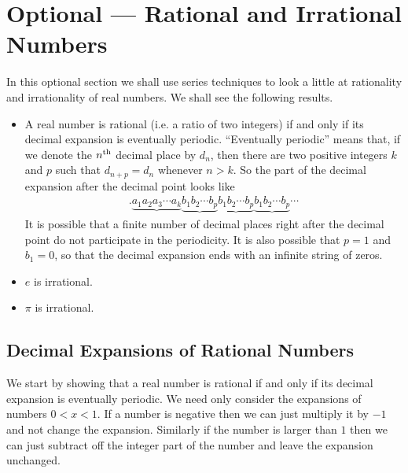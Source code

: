 \section{Optional --- Rational and Irrational Numbers}\label{sec:RatIrr}

In this optional section we shall use series techniques to look a little
at rationality and irrationality of real numbers. We shall
see the following results.
\begin{itemize}\itemsep1pt \parskip0pt  %
\item A real number is rational (i.e. a ratio of two integers)
if and only if its decimal expansion is eventually periodic.
``Eventually periodic'' means that, if we denote the $n^{\rm th}$ decimal place by $d_n$, then there are two positive integers $k$ and $p$
such that $d_{n+p}=d_n$ whenever $n>k$.  So the part of the decimal
expansion after the decimal point looks like
\begin{align*}
 .\underbrace{a_1 a_2 a_3 \cdots a_k}
          \underbrace{b_1 b_2\cdots b_p}
          \underbrace{b_1 b_2\cdots b_p}
          \underbrace{b_1 b_2\cdots b_p} \cdots
\end{align*}
It is possible that a finite number of decimal places right after the decimal
point do not participate in the periodicity. It is also possible that $p=1$
and $b_1=0$, so that the decimal expansion ends with an infinite string of
zeros.
\item $e$ is irrational.
\item $\pi$ is irrational.
\end{itemize}


\subsection*{Decimal Expansions of Rational Numbers}
We start by showing that a real number is rational
if and only if its decimal expansion is eventually periodic.
We need only consider the expansions of numbers $0<x<1$. If a number is negative then we can just multiply it by $-1$
and not change the expansion. Similarly if the number is larger than $1$ then we can just subtract off the integer part
of the number and leave the expansion unchanged.


